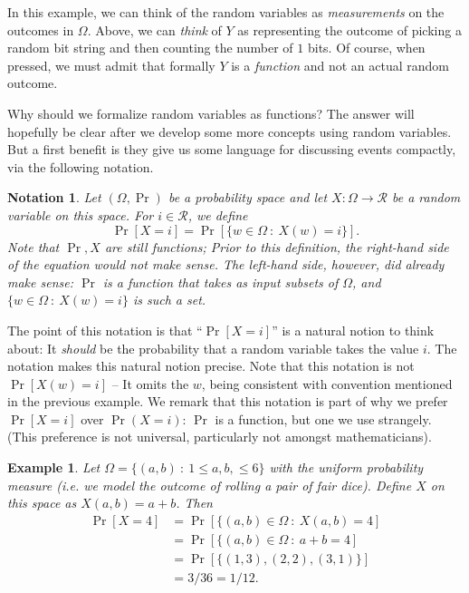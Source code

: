 \documentclass[11pt]{article}
\newtheorem{notation}{Notation}
\newtheorem{example}{Example}
\newcommand{\rvrange}{\mathcal{R}}
\begin{document}
In this example, we can think of the random variables as \emph{measurements} on
the outcomes in $\Omega$. Above, we can \emph{think} of $Y$ as representing
the outcome of picking a random bit string and then counting the number of
$1$ bits. Of course, when pressed, we must admit that formally $Y$ is a
\emph{function} and not an actual random outcome.

Why should we formalize random variables as functions? The answer will
hopefully be clear after we develop some more concepts using random variables.
But a first benefit is they give us some language for discussing events
compactly, via the following notation.

\begin{notation}
    Let $(\Omega,\Pr)$ be a probability space and let $X:\Omega\to\rvrange$ be
    a random variable on this space.  For $i\in\rvrange$, we define
    \[
        \Pr[X=i] = \Pr[\{w\in\Omega\ : \ X(w)=i\}].
    \]
    Note that $\Pr,X$ are still functions; Prior to this definition,
    the right-hand side of the equation would not make sense.
    The left-hand side, however,  did already make sense: $\Pr$ is a function
    that takes as input subsets of $\Omega$, and $\{w\in\Omega\ : \ X(w)=i\}$
    is such a set.
\end{notation}
The point of this notation is that ``$\Pr[X=i]$'' is a natural notion
to think about: It \emph{should} be the probability that a random variable
takes the value $i$. The notation makes this natural notion precise.
Note that this notation is not $\Pr[X(w)=i]$ -- It omits the $w$, being
consistent with convention mentioned in the previous example.
We remark that this notation is part of why we prefer $\Pr[X=i]$ over
$\Pr(X=i)$: $\Pr$ is a function, but one we use strangely. (This preference
is not universal, particularly not amongst mathematicians).

\begin{example}\label{ex:dicesum}
    Let $\Omega = \{(a,b)\ : \ 1\leq a,b, \leq 6\}$ with the uniform
    probability measure (i.e. we model the outcome of rolling a pair of
    fair dice). Define $X$ on this space as $X(a,b) = a+b$.
    Then
    \begin{align*}
        \Pr[X=4]  
        & = \Pr[\{(a,b)\in\Omega\ : \ X(a,b)=4] \\
        & = \Pr[\{(a,b)\in\Omega\ : \ a+b=4] \\
        & = \Pr[\{(1,3),(2,2),(3,1)\}] \\
        & = 3/36 = 1/12.
    \end{align*}
\end{example}
\end{document}
